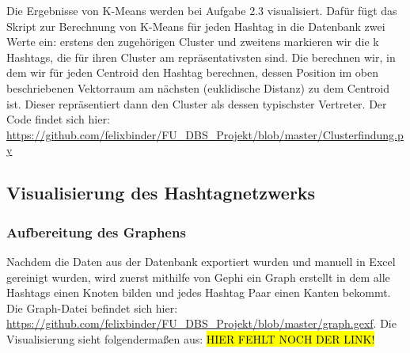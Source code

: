 \documentclass[BCOR0mm,fontsize=12pt,paper=a4,final,numbers=noenddot]{scrartcl}
\begin{document}
Die Ergebnisse von K-Means werden bei Aufgabe 2.3 visualisiert. Dafür fügt das Skript zur Berechnung von K-Means für jeden Hashtag in die Datenbank zwei Werte ein: erstens den zugehörigen Cluster und zweitens markieren wir die k Hashtags, die für ihren Cluster am repräsentativsten sind. Die berechnen wir, in dem wir für jeden Centroid den Hashtag berechnen, dessen Position im oben beschriebenen Vektorraum am nächsten (euklidische Distanz) zu dem Centroid ist. Dieser repräsentiert dann den Cluster als dessen typischster Vertreter. Der Code findet sich hier: \url{https://github.com/felixbinder/FU_DBS_Projekt/blob/master/Clusterfindung.py}

\subsection{Visualisierung des Hashtagnetzwerks}

\subsubsection{Aufbereitung des Graphens}

Nachdem die Daten aus der Datenbank exportiert wurden und manuell in Excel gereinigt wurden, wird zuerst mithilfe von Gephi ein Graph erstellt in dem alle Hashtags einen Knoten bilden und jedes Hashtag Paar einen Kanten bekommt. Die Graph-Datei befindet sich hier: \url{https://github.com/felixbinder/FU_DBS_Projekt/blob/master/graph.gexf}. Die Visualisierung sieht folgendermaßen aus: \hl{HIER FEHLT NOCH DER LINK!}
\end{document}
